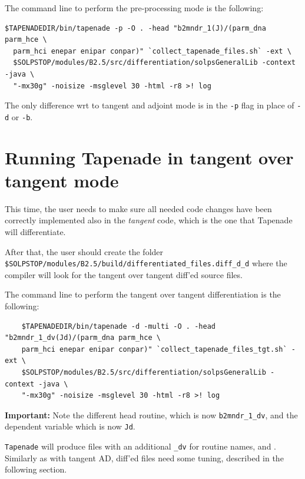 The command line to perform the pre-processing mode is the following:
\begin{verbatim}
$TAPENADEDIR/bin/tapenade -p -O . -head "b2mndr_1(J)/(parm_dna parm_hce \
  parm_hci enepar enipar conpar)" `collect_tapenade_files.sh` -ext \
  $SOLPSTOP/modules/B2.5/src/differentiation/solpsGeneralLib -context -java \
  "-mx30g" -noisize -msglevel 30 -html -r8 >! log
\end{verbatim}

The only difference wrt to tangent and adjoint mode is in the {\tt -p} flag in place of {\tt -d} or {\tt -b}.

\section{Running Tapenade in tangent over tangent mode}\label{sec:tgttgt}

This time, the user needs to make sure all needed code changes have been correctly implemented also in the \textit{tangent} code, which is the one that Tapenade will differentiate.

After that, the user should create the folder {\tt \$SOLPSTOP/modules/B2.5/build/differentiated\_files\allowbreak.diff\_d\_d} where the compiler will look for the tangent over tangent diff'ed source files. 

The command line to perform the tangent over tangent differentiation is the following:
\begin{verbatim}
	$TAPENADEDIR/bin/tapenade -d -multi -O . -head "b2mndr_1_dv(Jd)/(parm_dna parm_hce \
	parm_hci enepar enipar conpar)" `collect_tapenade_files_tgt.sh` -ext \
	$SOLPSTOP/modules/B2.5/src/differentiation/solpsGeneralLib -context -java \
	"-mx30g" -noisize -msglevel 30 -html -r8 >! log
\end{verbatim}

\textbf{Important:} Note the different head routine, which is now {\tt b2mndr\_1\_dv}, and the dependent variable which is now {\tt Jd}.

{\tt Tapenade} will produce files with an additional {\tt \_dv} for routine names, and . Similarly as with tangent AD, diff'ed files need some tuning, described in the following section.

